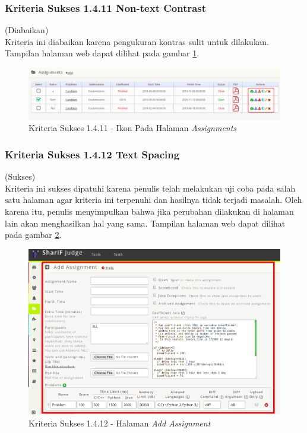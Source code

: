 \documentclass[a4paper,twoside]{article}
\begin{document}
\begin{enumerate}
		\subsubsection*{Kriteria Sukses 1.4.11 Non-text Contrast}
		\label{subsubsec:kepatuhan_kriteria_1.4.11}
		(Diabaikan) \\
		
		Kriteria ini diabaikan karena pengukuran kontras sulit untuk dilakukan. Tampilan halaman web dapat dilihat pada gambar \ref{fig:kepatuhan_1_4_11_reflow}.
		\begin{figure}[H]
			\centering  
			\includegraphics[scale=0.3]{kepatuhan_1_4_11}  
			\caption[Kriteria Sukses 1.4.11 - Ikon Pada Halaman \textit{Assignments}]{Kriteria Sukses 1.4.11 - Ikon Pada Halaman \textit{Assignments}} 
			\label{fig:kepatuhan_1_4_11_reflow} 
		\end{figure}
		
		\subsubsection*{Kriteria Sukses 1.4.12 Text Spacing}
		\label{subsubsec:kepatuhan_kriteria_1.4.12}
		(Sukses) \\
		
		Kriteria ini sukses dipatuhi karena penulis telah melakukan uji coba pada salah satu halaman agar kriteria ini terpenuhi dan hasilnya tidak terjadi masalah. Oleh karena itu, penulis menyimpulkan bahwa jika perubahan dilakukan di halaman lain akan menghasilkan hal yang sama. Tampilan halaman web dapat dilihat pada gambar \ref{fig:kepatuhan_1_4_12}.
		\begin{figure}[H]
			\centering  
			\includegraphics[scale=0.3]{kepatuhan_1_4_12}  
			\caption[Kriteria Sukses 1.4.12 - Halaman \textit{Add Assignment}]{Kriteria Sukses 1.4.12 - Halaman \textit{Add Assignment}} 
			\label{fig:kepatuhan_1_4_12} 
		\end{figure}
	

\end{enumerate}
\end{document}
